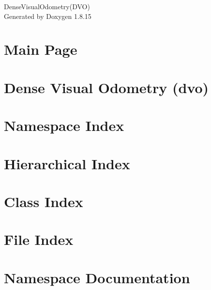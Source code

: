 \documentclass[twoside]{book}
\newcommand{\+}{\discretionary{\mbox{\scriptsize$\hookleftarrow$}}{}{}}
\newcommand{\clearemptydoublepage}{%
  \newpage{\pagestyle{empty}\cleardoublepage}%
}
\begin{document}
\hypersetup{pageanchor=false,
             bookmarksnumbered=true,
             pdfencoding=unicode
            }
\begin{titlepage}
\vspace*{7cm}
\begin{center}%
{\Large Dense\+Visual\+Odometry(D\+VO) }\\
\vspace*{1cm}
{\large Generated by Doxygen 1.8.15}\\
\end{center}
\end{titlepage}
\clearemptydoublepage
{}
\tableofcontents
\clearemptydoublepage
{}
\hypersetup{pageanchor=true}

\chapter{Main Page}
\label{index}\hypertarget{index}{}
\chapter{Dense Visual Odometry (dvo)}
\label{md__r_e_a_d_m_e}

\chapter{Namespace Index}

\chapter{Hierarchical Index}

\chapter{Class Index}

\chapter{File Index}

\chapter{Namespace Documentation}










\end{document}
